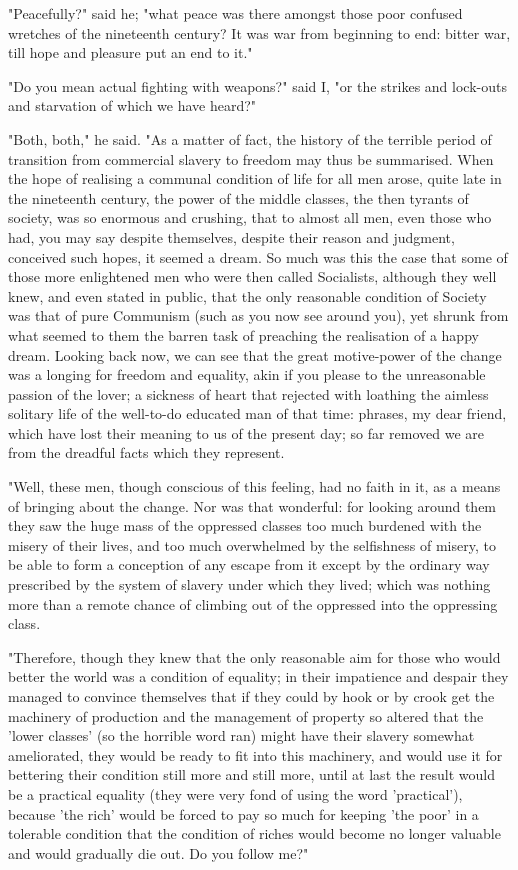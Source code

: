 "Peacefully?" said he; "what peace was there amongst those poor confused
wretches of the nineteenth century? It was war from beginning to end:
bitter war, till hope and pleasure put an end to it."

"Do you mean actual fighting with weapons?" said I, "or the strikes and
lock-outs and starvation of which we have heard?"

"Both, both," he said. "As a matter of fact, the history of the terrible
period of transition from commercial slavery to freedom may thus be
summarised. When the hope of realising a communal condition of life for
all men arose, quite late in the nineteenth century, the power of the
middle classes, the then tyrants of society, was so enormous and
crushing, that to almost all men, even those who had, you may say
despite themselves, despite their reason and judgment, conceived such
hopes, it seemed a dream. So much was this the case that some of those
more enlightened men who were then called Socialists, although they well
knew, and even stated in public, that the only reasonable condition of
Society was that of pure Communism (such as you now see around you), yet
shrunk from what seemed to them the barren task of preaching the
realisation of a happy dream. Looking back now, we can see that the
great motive-power of the change was a longing for freedom and equality,
akin if you please to the unreasonable passion of the lover; a sickness
of heart that rejected with loathing the aimless solitary life of the
well-to-do educated man of that time: phrases, my dear friend, which
have lost their meaning to us of the present day; so far removed we are
from the dreadful facts which they represent.

"Well, these men, though conscious of this feeling, had no faith in it,
as a means of bringing about the change. Nor was that wonderful: for
looking around them they saw the huge mass of the oppressed classes too
much burdened with the misery of their lives, and too much overwhelmed
by the selfishness of misery, to be able to form a conception of any
escape from it except by the ordinary way prescribed by the system of
slavery under which they lived; which was nothing more than a remote
chance of climbing out of the oppressed into the oppressing class.

"Therefore, though they knew that the only reasonable aim for those who
would better the world was a condition of equality; in their impatience
and despair they managed to convince themselves that if they could by
hook or by crook get the machinery of production and the management of
property so altered that the 'lower classes' (so the horrible word ran)
might have their slavery somewhat ameliorated, they would be ready to
fit into this machinery, and would use it for bettering their condition
still more and still more, until at last the result would be a practical
equality (they were very fond of using the word 'practical'), because
'the rich' would be forced to pay so much for keeping 'the poor' in a
tolerable condition that the condition of riches would become no longer
valuable and would gradually die out. Do you follow me?"

